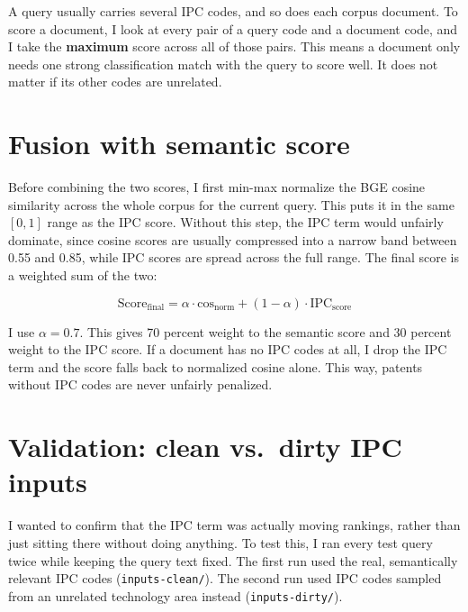 \documentclass[11pt]{article}
\begin{document}
A query usually carries several IPC codes, and so does each corpus document. To
score a document, I look at every pair of a query code and a document code, and I
take the \textbf{maximum} score across all of those pairs. This means a document
only needs one strong classification match with the query to score well. It does
not matter if its other codes are unrelated.

\section{Fusion with semantic score}

Before combining the two scores, I first min-max normalize the BGE cosine similarity
across the whole corpus for the current query. This puts it in the same $[0,1]$
range as the IPC score. Without this step, the IPC term would unfairly dominate,
since cosine scores are usually compressed into a narrow band between 0.55 and 0.85,
while IPC scores are spread across the full range. The final score is a weighted sum
of the two:

\[
  \text{Score}_{\text{final}} = \alpha \cdot \text{cos}_{\text{norm}} + (1-\alpha) \cdot \text{IPC}_{\text{score}}
\]

I use $\alpha = 0.7$. This gives 70 percent weight to the semantic score and 30
percent weight to the IPC score. If a document has no IPC codes at all, I drop the
IPC term and the score falls back to normalized cosine alone. This way, patents
without IPC codes are never unfairly penalized.

\section{Validation: clean vs.\ dirty IPC inputs}

I wanted to confirm that the IPC term was actually moving rankings, rather than just
sitting there without doing anything. To test this, I ran every test query twice
while keeping the query text fixed. The first run used the real, semantically
relevant IPC codes (\texttt{inputs-clean/}). The second run used IPC codes sampled
from an unrelated technology area instead (\texttt{inputs-dirty/}).
\end{document}
